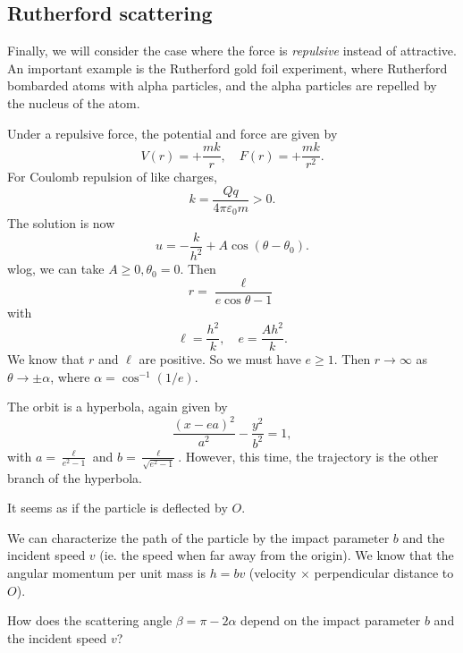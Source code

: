 \documentclass[a4paper]{article}
\begin{document}
\subsection{Rutherford scattering}
Finally, we will consider the case where the force is \emph{repulsive} instead of attractive. An important example is the Rutherford gold foil experiment, where Rutherford bombarded atoms with alpha particles, and the alpha particles are repelled by the nucleus of the atom.

Under a repulsive force, the potential and force are given by
\[
  V(r) = +\frac{mk}{r}, \quad F(r) = +\frac{mk}{r^2}.
\]
For Coulomb repulsion of like charges,
\[
  k = \frac{Qq}{4\pi \varepsilon_0 m} > 0.
\]
The solution is now
\[
  u = -\frac{k}{h^2} + A\cos (\theta - \theta_0).
\]
wlog, we can take $A \geq 0, \theta_0 = 0$. Then
\[
  r = \frac{\ell}{e\cos \theta - 1}
\]
with
\[
  \ell = \frac{h^2}{k}, \quad e = \frac{Ah^2}{k}.
\]
We know that $r$ and $\ell$ are positive. So we must have $e \geq 1$. Then $r\to \infty$ as $\theta \to \pm \alpha$, where $\alpha = \cos^{-1}(1/e)$.

The orbit is a hyperbola, again given by
\[
  \frac{(x - ea)^2}{a^2} - \frac{y^2}{b^2} = 1,
\]
with $a = \frac{\ell}{e^2 - 1}$ and $b = \frac{\ell}{\sqrt{e^2 - 1}}$. However, this time, the trajectory is the other branch of the hyperbola.
\begin{center}
\end{center}
It seems as if the particle is deflected by $O$.

We can characterize the path of the particle by the impact parameter $b$ and the incident speed $v$ (ie. the speed when far away from the origin). We know that the angular momentum per unit mass is $h = bv$ (velocity $\times$ perpendicular distance to $O$).

How does the scattering angle $\beta = \pi - 2\alpha$ depend on the impact parameter $b$ and the incident speed $v$?
\end{document}
